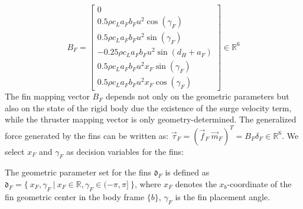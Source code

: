 \begin{equation}
B_{F}=\begin{bmatrix}
0\\0.5\rho c_{L}a_{F}b_{F} u^{2}\cos(\gamma_{F})\\
0.5\rho c_{L}a_{F}b_{F} u^{2}\sin(\gamma_{F})\\
-0.25\rho c_{L}a_{F}b_{F} u^{2}\sin(d_{H}+a_{F}) \\
0.5\rho c_{L}a_{F}b_{F} u^{2}x_{F}\sin(\gamma_{F})\\
0.5\rho c_{L}a_{F}b_{F} u^{2}x_{F}\cos(\gamma_{F})
\end{bmatrix} \in \mathbb{R}^{6}
\end{equation}
The fin mapping vector $B_{F}$ depends not only on the geometric parameters but also on the state of the rigid body due the existence of the surge velocity term, while the thruster mapping vector is only geometry-determined. The generalized force generated by the fins can be written as: $\vec{\tau}_{F}=(\vec{f}_{F}~\vec{m}_{F})^{T}=B_{F}\delta_{F}\in \mathbb{R}^{6}$. We select $x_{F}$ and $\gamma_{F}$ as decision variables for the fins:
\begin{definition}
The geometric parameter set for the fins $\mathfrak{d}_{F}$ is defined as $\mathfrak{d}_{F}=\lbrace~x_{F}, \gamma_{F}~|~x_{F}\in \mathbb{R}, \gamma_{F} \in (-\pi,\pi]~\rbrace$, where $x_{F}$ denotes the $x_b$-coordinate of the fin geometric center in the body frame $\lbrace b \rbrace$, $\gamma_{F}$ is the fin placement angle. 
\end{definition}
